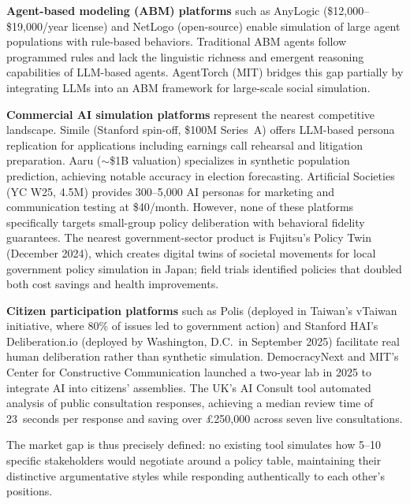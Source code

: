 \textbf{Agent-based modeling (ABM) platforms} such as AnyLogic (\$12,000--\$19,000/year license) and NetLogo (open-source) enable simulation of large agent populations with rule-based behaviors. Traditional ABM agents follow programmed rules and lack the linguistic richness and emergent reasoning capabilities of LLM-based agents. AgentTorch (MIT) bridges this gap partially by integrating LLMs into an ABM framework for large-scale social simulation.

\textbf{Commercial AI simulation platforms} represent the nearest competitive landscape. Simile (Stanford spin-off, \$100M Series~A) offers LLM-based persona replication for applications including earnings call rehearsal and litigation preparation. Aaru ($\sim$\$1B valuation) specializes in synthetic population prediction, achieving notable accuracy in election forecasting. Artificial Societies (YC W25, \EUR{}4.5M) provides 300--5,000 AI personas for marketing and communication testing at \$40/month. However, none of these platforms specifically targets small-group policy deliberation with behavioral fidelity guarantees. The nearest government-sector product is Fujitsu's Policy Twin (December 2024), which creates digital twins of societal movements for local government policy simulation in Japan; field trials identified policies that doubled both cost savings and health improvements.

\textbf{Citizen participation platforms} such as Polis (deployed in Taiwan's vTaiwan initiative, where 80\% of issues led to government action) and Stanford HAI's Deliberation.io (deployed by Washington, D.C.\ in September 2025) facilitate real human deliberation rather than synthetic simulation. DemocracyNext and MIT's Center for Constructive Communication launched a two-year lab in 2025 to integrate AI into citizens' assemblies. The UK's AI Consult tool automated analysis of public consultation responses, achieving a median review time of 23~seconds per response and saving over \pounds{}250,000 across seven live consultations.

The market gap is thus precisely defined: no existing tool simulates how 5--10 specific stakeholders would negotiate around a policy table, maintaining their distinctive argumentative styles while responding authentically to each other's positions.
